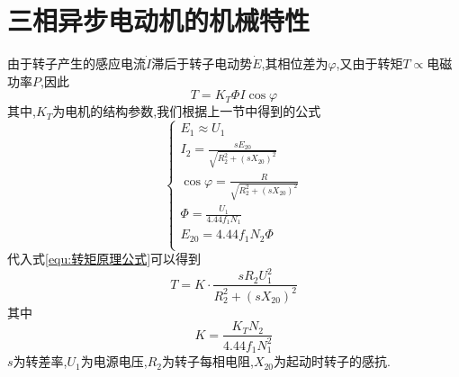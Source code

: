 \section{\K 三相异步电动机的机械特性}
\Par 由于转子产生的感应电流$\dot{I}$滞后于转子电动势$\dot{E}$,其相位差为$\varphi $,又由于转矩$T\propto $电磁功率$P$,因此
\begin{equation}\label{equ:转矩原理公式}
    T=K_T\varPhi I\cos \varphi 
\end{equation}
其中,$K_T$为电机的结构参数,我们根据上一节中得到的公式
\begin{equation*}
    \begin{cases}
        E_1\approx U_1\\
        I_2=\frac{sE_{20}}{\sqrt{R_{2}^{2}+\left( sX_{20} \right) ^2}}\\
        \cos \varphi =\frac{R}{\sqrt{R_{2}^{2}+\left( sX_{20} \right) ^2}}\\
        \varPhi =\frac{U_1}{4.44f_1N_1}\\
        E_{20}=4.44f_1N_2\varPhi\\
    \end{cases}
\end{equation*}
代入式\ref{equ:转矩原理公式}可以得到
\begin{equation}
    T=K\cdot \frac{sR_2U_{1}^{2}}{R_{2}^{2}+\left( sX_{20} \right) ^2}
\end{equation}
其中
\begin{equation*}
    K=\frac{K_TN_2}{4.44f_1N_{1}^{2}}
\end{equation*}
$s$为转差率,$U_1$为电源电压,$R_2$为转子每相电阻,$X_{20}$为起动时转子的感抗.

